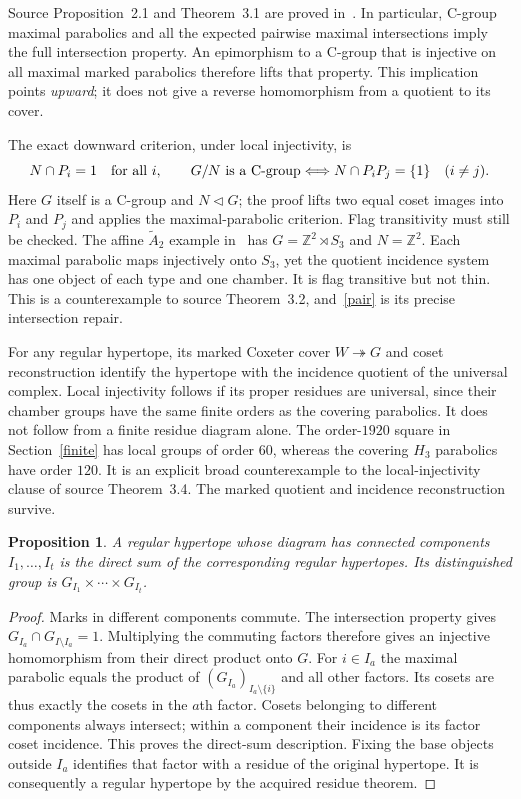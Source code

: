\documentclass[11pt,a4paper]{article}
\newtheorem{proposition}[theorem]{Proposition}
\newcommand{\Z}{\mathbb Z}
\begin{document}
Source Proposition~2.1 and Theorem~3.1 are proved in~\cite{kernel}.
In particular, C-group maximal parabolics and all the expected pairwise
maximal intersections imply the full intersection property. An epimorphism
to a C-group that is injective on all maximal marked parabolics therefore
lifts that property. This implication points \emph{upward}; it does not
give a reverse homomorphism from a quotient to its cover.

The exact downward criterion, under local injectivity, is
\begin{equation}\label{pair}
 N\cap P_i=1\quad\hbox{for all }i,\qquad
 G/N\hbox{ is a C-group} \Longleftrightarrow
 N\cap P_iP_j=\{1\}\quad(i\ne j).
\end{equation}
Here $G$ itself is a C-group and $N\triangleleft G$; the proof lifts two
equal coset images into $P_i$ and $P_j$ and applies the maximal-parabolic
criterion. Flag transitivity must still be checked. The affine $\widetilde A_2$
example in~\cite{kernel} has $G=\Z^2\rtimes S_3$ and $N=\Z^2$.
Each maximal parabolic maps injectively onto $S_3$, yet the quotient
incidence system has one object of each type and one chamber. It is flag
transitive but not thin. This is a counterexample to source Theorem~3.2,
and~\eqref{pair} is its precise intersection repair.

For any regular hypertope, its marked Coxeter cover $W\twoheadrightarrow G$
and coset reconstruction identify the hypertope with the incidence quotient
of the universal complex. Local injectivity follows if its proper residues
are universal, since their chamber groups have the same finite orders as
the covering parabolics. It does not follow from a finite residue diagram
alone. The order-$1920$ square in Section~\ref{finite} has local groups of
order $60$, whereas the covering $H_3$ parabolics have order $120$.
It is an explicit broad counterexample to the local-injectivity clause of
source Theorem~3.4. The marked quotient and incidence reconstruction survive.

\begin{proposition}\label{reducible}
A regular hypertope whose diagram has connected components $I_1,\ldots,I_t$
is the direct sum of the corresponding regular hypertopes. Its distinguished
group is $G_{I_1}\times\cdots\times G_{I_t}$.
\end{proposition}
\begin{proof}
Marks in different components commute. The intersection property gives
$G_{I_a}\cap G_{I\setminus I_a}=1$. Multiplying the commuting factors
therefore gives an injective homomorphism from their direct product onto
$G$. For $i\in I_a$ the maximal parabolic equals the product of
$(G_{I_a})_{I_a\setminus\{i\}}$ and all other factors. Its cosets are
thus exactly the cosets in the $a$th factor. Cosets belonging to different
components always intersect; within a component their incidence is its
factor coset incidence. This proves the direct-sum description. Fixing the
base objects outside $I_a$ identifies that factor with a residue of the
original hypertope. It is consequently a regular hypertope by the acquired
residue theorem.
\end{proof}
\end{document}
